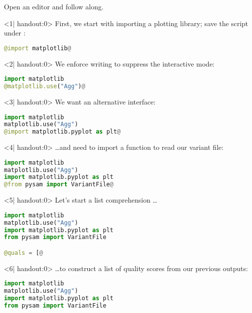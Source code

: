 \setcounter{preframe_handson}{\value{handson}}
\begin{frame}[fragile]
  \frametitle{}
  \setcounter{handson}{\value{preframe_handson}}
  \begin{task}
  	Open an editor and follow along.
  \end{task}
  \begin{onlyenv}<1| handout:0>
   First, we start with importing a plotting library; save the script under :
   \begin{lstlisting}[language=Python,style=Python]
@import matplotlib@
   \end{lstlisting}
  \end{onlyenv}
  \begin{onlyenv}<2| handout:0>
   We enforce writing to suppress the interactive mode:
   \begin{lstlisting}[language=Python,style=Python]
import matplotlib
@matplotlib.use("Agg")@
   \end{lstlisting}
  \end{onlyenv}
  \begin{onlyenv}<3| handout:0>
   We want an alternative interface:
   \begin{lstlisting}[language=Python,style=Python]
import matplotlib
matplotlib.use("Agg")
@import matplotlib.pyplot as plt@
   \end{lstlisting}
  \end{onlyenv}
  \begin{onlyenv}<4| handout:0>
   \ldots and need to import a function to read our variant file:
   \begin{lstlisting}[language=Python,style=Python]
import matplotlib
matplotlib.use("Agg")
import matplotlib.pyplot as plt
@from pysam import VariantFile@
   \end{lstlisting}
  \end{onlyenv}
  \begin{onlyenv}<5| handout:0>
   Let's start a list comprehension \ldots
   \begin{lstlisting}[language=Python,style=Python]
import matplotlib
matplotlib.use("Agg")
import matplotlib.pyplot as plt
from pysam import VariantFile

@quals = [@
   \end{lstlisting}
  \end{onlyenv}
   \begin{onlyenv}<6| handout:0>
   \ldots to construct a list of quality scores from our previous outputs:
   \begin{lstlisting}[language=Python,style=Python]
import matplotlib
matplotlib.use("Agg")
import matplotlib.pyplot as plt
from pysam import VariantFile


\end{lstlisting}
\end{onlyenv}
\end{frame}
